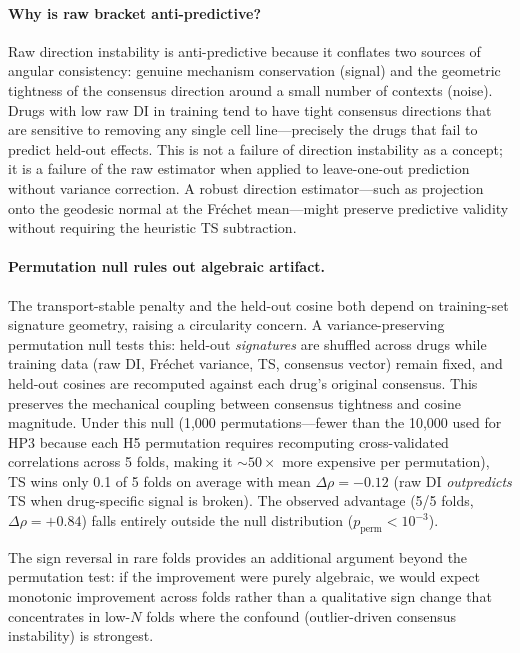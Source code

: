 \documentclass{article}
\begin{document}
\paragraph{Why is raw bracket anti-predictive?}
Raw direction instability is anti-predictive because it conflates two
sources of angular consistency: genuine mechanism conservation (signal)
and the geometric tightness of the consensus direction around a small
number of contexts (noise). Drugs with low raw DI in training tend to
have tight consensus directions that are sensitive to removing any single
cell line---precisely the drugs that fail to predict held-out effects.
This is not a failure of direction instability as a concept; it is a
failure of the raw estimator when applied to leave-one-out prediction
without variance correction. A robust direction estimator---such as
projection onto the geodesic normal at the Fr\'echet mean---might
preserve predictive validity without requiring the heuristic TS
subtraction.

\paragraph{Permutation null rules out algebraic artifact.}
The transport-stable penalty and the held-out cosine both depend on
training-set signature geometry, raising a circularity concern.
A variance-preserving permutation null tests this: held-out
\emph{signatures} are shuffled across drugs while training data
(raw DI, Fr\'echet variance, TS, consensus vector) remain fixed,
and held-out cosines are recomputed against each drug's original
consensus. This preserves the mechanical coupling between consensus
tightness and cosine magnitude. Under this null (1{,}000 permutations---fewer
than the 10{,}000 used for HP3 because each H5 permutation requires
recomputing cross-validated correlations across 5 folds, making it
${\sim}50\times$ more expensive per permutation),
TS wins only 0.1 of 5 folds on average with mean $\Delta\rho = -0.12$
(raw DI \emph{outpredicts} TS when drug-specific signal is broken).
The observed advantage (5/5 folds, $\Delta\rho = +0.84$) falls entirely
outside the null distribution ($p_{\text{perm}} < 10^{-3}$).

The sign reversal in rare folds provides an additional argument beyond
the permutation test: if the improvement were purely algebraic, we
would expect monotonic improvement across folds rather than a qualitative
sign change that concentrates in low-$N$ folds where the confound
(outlier-driven consensus instability) is strongest.
\end{document}
